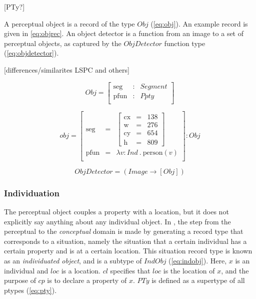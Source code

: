 [PTy?]

A perceptual object is a record of the type $Obj$ (\autoref{eq:obj}).
An example record is given in \autoref{eq:objrec}.
An object detector is a function from an image to a set of perceptual objects, as captured by the $ObjDetector$ function type (\autoref{eq:objdetector}).

[differences/similarites LSPC and others]

\begin{equation}\label{eq:obj}
Obj = \left[\begin{array}{rcl}
\text{seg} &:& Segment\\
\text{pfun} &:& Ppty \\
\end{array}\right]\end{equation}

\begin{equation}\label{eq:objrec}
obj =
\left[\begin{array}{rcl}
\text{seg} &=& \left[\begin{array}{rcl}
\text{cx} &=& 138\\
\text{w} &=& 276\\
\text{cy} &=& 654\\
\text{h} &=& 809
\end{array}\right]\\
\text{pfun} &=& \lambda v:Ind\ .\ \text{person}(v)\\
\end{array}\right] : Obj\end{equation}

\begin{equation}\label{eq:objdetector}
ObjDetector = ( Image \rightarrow [Obj] )
\end{equation}



\subsubsection{Individuation}

The perceptual object couples a property with a location, but it does not explicitly say anything about any individual object.
In \cite{lspc}, the step from the perceptual to the \textit{conceptual} domain is made by generating a record type that corresponds to a situation, namely the situation that a certain individual has a certain property and is at a certain location.
This situation record type is known as an \textit{individuated object}, and is a subtype of $IndObj$ (\autoref{eq:indobj}).
Here, $x$ is an individual and $loc$ is a location.
$cl$ specifies that $loc$ is the location of $x$, and the purpose of $cp$ is to declare a property of $x$.
$PTy$ is defined as a supertype of all ptypes (\autoref{eq:pty}).


